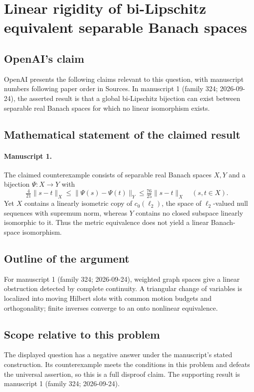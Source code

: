 \documentclass[11pt]{article}
\begin{document}
\section*{Linear rigidity of bi-Lipschitz equivalent separable Banach spaces}

\subsection{OpenAI's claim}
OpenAI presents the following claims relevant to this question, with manuscript numbers following paper order in Sources. In manuscript 1 (family 324; 2026-09-24), the asserted result is that a global bi-Lipschitz bijection can exist between separable real Banach spaces for which no linear isomorphism exists.

\subsection{Mathematical statement of the claimed result}
\paragraph{Manuscript 1.}
The claimed counterexample consists of separable real Banach spaces $X,Y$ and a bijection $\Psi:X\to Y$ with
\[
 \tfrac4{21}\|s-t\|_X\le\|\Psi(s)-\Psi(t)\|_Y\le\tfrac{76}{25}\|s-t\|_X
 \quad(s,t\in X).
\]
Yet $X$ contains a linearly isometric copy of $c_0(\ell_2)$, the space of $\ell_2$-valued null sequences with supremum norm, whereas $Y$ contains no closed subspace linearly isomorphic to it. Thus the metric equivalence does not yield a linear Banach-space isomorphism.

\subsection{Outline of the argument}
For manuscript 1 (family 324; 2026-09-24), weighted graph spaces give a linear obstruction detected by complete continuity. A triangular change of variables is localized into moving Hilbert slots with common motion budgets and orthogonality; finite inverses converge to an onto nonlinear equivalence.

\subsection{Scope relative to this problem}
The displayed question has a negative answer under the manuscript's stated construction. Its counterexample meets the conditions in this problem and defeats the universal assertion, so this is a full disproof claim. The supporting result is manuscript 1 (family 324; 2026-09-24).
\end{document}
